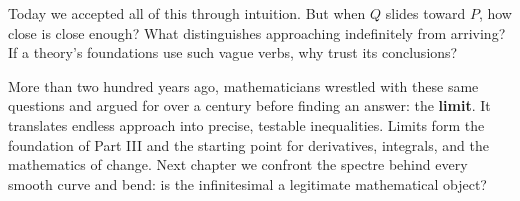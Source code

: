 Today we accepted all of this through intuition. But when $Q$ slides toward $P$, how close is close enough? What distinguishes approaching indefinitely from arriving? If a theory's foundations use such vague verbs, why trust its conclusions?

More than two hundred years ago, mathematicians wrestled with these same questions and argued for over a century before finding an answer: the \textbf{limit}. It translates endless approach into precise, testable inequalities. Limits form the foundation of Part III and the starting point for derivatives, integrals, and the mathematics of change. Next chapter we confront the spectre behind every smooth curve and bend: is the infinitesimal a legitimate mathematical object?
